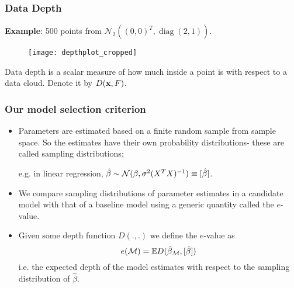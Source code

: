 \documentclass[10pt]{beamer}
\theoremstyle{definition}
\DeclareMathOperator*{\diag}{diag}
\begin{document}
\begin{frame}
\frametitle{Data Depth}
\textbf{Example}: 500 points from $\mathcal{N}_2 ((0,0)^T, \diag (2,1))$.
\begin{figure}\begin{center}
   \texttt{[image: depthplot\_cropped]}
   \label{fig:fig3}
\end{center}
\end{figure}
%
Data depth is a {\colbbf scalar measure of how much inside a point is with respect to a data cloud}. Denote it by $D( {\bf{x}}, F)$.
\end{frame}


\begin{frame}
\frametitle{Our model selection criterion}

\begin{itemize}
\item Parameters are estimated based on a finite random sample from sample space. So the estimates have their own probability distributions- these are called {\colbit sampling distributions};

e.g. in linear regression, $\hat \beta \sim {\cal{N}} (\beta, \sigma^2 (X^T X)^{-1}) \equiv [ \hat \beta ]$.
\vspace{1em}

\item We compare sampling distributions of parameter estimates in a candidate model with that of a baseline model using a generic quantity called the {\colbbf $e$-value}.
\vspace{1em}

\item Given some depth function $D(.,.)$ we define the $e$-value as
%
$$
e ({\cal{M}}) = {\mathbb{E}} D( \hat \beta_{\cal{M}}, [ \hat \beta])
$$
%
i.e. the expected depth of the model estimates with respect to the sampling distribution of $\hat \beta$.
\end{itemize}
\end{frame}

\end{document}
